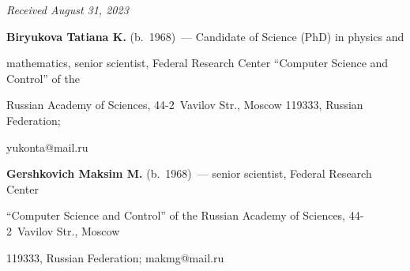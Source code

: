 \vspace*{-6pt}





\hfill{\small\textit{Received August 31, 2023}} 





\vspace*{-16pt} 


  


\Contr





\vspace*{-3pt}





\noindent


\textbf{Biryukova Tatiana K.} (b.\ 1968)~--- Candidate of Science (PhD) in physics and 


mathematics, senior scientist, Federal Research Center ``Computer Science and Control'' of the 


Russian Academy of Sciences, 44-2~Vavilov Str., Moscow 119333, Russian Federation; 


\mbox{yukonta@mail.ru}





\vspace*{3pt}





\noindent


\textbf{Gershkovich Maksim M.} (b.\ 1968)~--- senior scientist, Federal Research Center 


``Computer Science and Control'' of the Russian Academy of Sciences, 44-2~Vavilov Str., Moscow 


119333, Russian Federation; \mbox{makmg@mail.ru }








\label{end\stat}





\renewcommand{\bibname}{\protect\rm Литература}    


